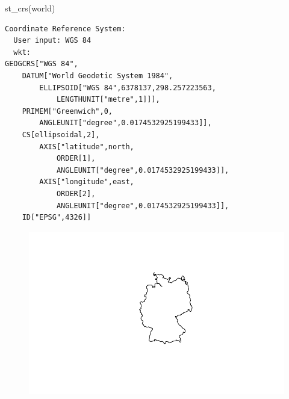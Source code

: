 \documentclass[
  letterpaper,
]{scrbook}
\newenvironment{Shaded}{\begin{snugshade}}{\end{snugshade}}
\newcommand{\CommentTok}[1]{\textcolor[rgb]{0.37,0.37,0.37}{#1}}
\newcommand{\FunctionTok}[1]{\textcolor[rgb]{0.28,0.35,0.67}{#1}}
\newcommand{\NormalTok}[1]{\textcolor[rgb]{0.00,0.23,0.31}{#1}}
\newcommand{\OtherTok}[1]{\textcolor[rgb]{0.00,0.23,0.31}{#1}}
\newcommand{\SpecialCharTok}[1]{\textcolor[rgb]{0.37,0.37,0.37}{#1}}
\newcommand{\StringTok}[1]{\textcolor[rgb]{0.13,0.47,0.30}{#1}}
\begin{document}
\begin{Shaded}
\begin{Highlighting}[]
\FunctionTok{st\_crs}\NormalTok{(world)}
\end{Highlighting}
\end{Shaded}

\begin{verbatim}
Coordinate Reference System:
  User input: WGS 84 
  wkt:
GEOGCRS["WGS 84",
    DATUM["World Geodetic System 1984",
        ELLIPSOID["WGS 84",6378137,298.257223563,
            LENGTHUNIT["metre",1]]],
    PRIMEM["Greenwich",0,
        ANGLEUNIT["degree",0.0174532925199433]],
    CS[ellipsoidal,2],
        AXIS["latitude",north,
            ORDER[1],
            ANGLEUNIT["degree",0.0174532925199433]],
        AXIS["longitude",east,
            ORDER[2],
            ANGLEUNIT["degree",0.0174532925199433]],
    ID["EPSG",4326]]
\end{verbatim}

\begin{Shaded}
\end{Shaded}

\begin{figure}[H]

{\centering \includegraphics{01_refresher_files/figure-pdf/unnamed-chunk-5-1.pdf}

}

\end{figure}
\end{document}
